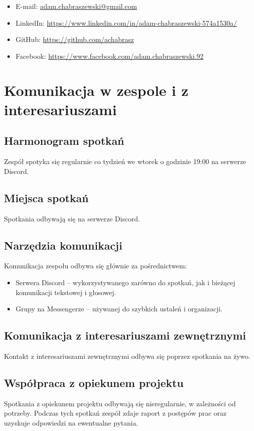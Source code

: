 \documentclass[12pt,a4paper]{book}
\begin{document}
\begin{itemize}
\begin{itemize}
        \begin{itemize}
            \item E-mail: \href{mailto:adam.chabraszewski@gmail.com}{adam.chabraszewski@gmail.com}   
            \item LinkedIn: \url{https://www.linkedin.com/in/adam-chabraszewski-574a1530a/}
            \item GitHub: \url{https://github.com/achabrasz}
            \item Facebook: \url{https://www.facebook.com/adam.chabraszewski.92}
        \end{itemize}
    \end{itemize}
\end{itemize}

\chapter{Komunikacja w zespole i z interesariuszami}
\section{Harmonogram spotkań}
Zespół spotyka się regularnie co tydzień we wtorek o godzinie 19:00 na serwerze Discord.  

\section{Miejsca spotkań}
Spotkania odbywają się na serwerze Discord.

\section{Narzędzia komunikacji}
Komunikacja zespołu odbywa się głównie za pośrednictwem:  
\begin{itemize}
    \item Serwera Discord – wykorzystywanego zarówno do spotkań, jak i bieżącej komunikacji tekstowej i głosowej.  
    \item Grupy na Messengerze – używanej do szybkich ustaleń i organizacji.  
\end{itemize}  

\section{Komunikacja z interesariuszami zewnętrznymi}
Kontakt z interesariuszami zewnętrznymi odbywa się poprzez spotkania na żywo.

\section{Współpraca z opiekunem projektu}
Spotkania z opiekunem projektu odbywają się nieregularnie, w zależności od potrzeby. Podczas tych spotkań zespół zdaje raport z postępów prac oraz uzyskuje odpowiedzi na ewentualne pytania.  
\end{document}
